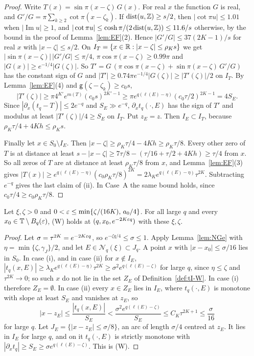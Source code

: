 \begin{proof}
Write $T(x)=\sin\pi(x-\zeta)\,G(x)$. For real $x$ the function $G$ is real, and $G'/G=\pi\sum_{k\ge2}\cot\pi(x-\zeta_k)$. If $\operatorname{dist}(u,\mathbb Z)\ge s/2$, then $|\cot\pi u|\le1.01$ when $|\operatorname{Im}u|\ge1$, and $|\cot\pi u|\le\cosh\pi/(2\operatorname{dist}(u,\mathbb Z))\le11.6/s$ otherwise, by the bound in the proof of Lemma~\ref{lem:EF}(2). Hence $|G'/G|\le37(2K-1)/s$ for real $x$ with $|x-\zeta|\le s/2$. On $I_T=\{x\in\mathbb R:|x-\zeta|\le\rho_Ks\}$ we get $|\sin\pi(x-\zeta)|\,|G'/G|\le\pi/4$, $\pi\cos\pi(x-\zeta)\ge0.99\pi$ and $|G(x)|\ge e^{-1/4}|G(\zeta)|$. So $T'=G\,(\pi\cos\pi(x-\zeta)+\sin\pi(x-\zeta)\,G'/G)$ has the constant sign of $G$ and $|T'|\ge0.74\pi e^{-1/4}|G(\zeta)|\ge|T'(\zeta)|/2$ on $I_T$. By Lemma~\ref{lem:EF}(4) and $\mathsf g(\zeta-\zeta_k)\ge c_0s$,
\[
|T'(\zeta)|\ge\pi4^{K'}e^{m(T)}(c_0s)^{2K'-1}\ge\pi e^{q(\ell(E)-\eta)}(c_0\tau/2)^{2K-1}=4S_E.
\]
Since $|\partial_x(t_q-T)|\le2e^{-q}$ and $S_E\gg e^{-q}$, $\partial_xt_q(\cdot,E)$ has the sign of $T'$ and modulus at least $|T'(\zeta)|/4\ge S_E$ on $I_T$. Put $z_E=z$. Then $I_E\subset I_T$, because $\rho_K\tau/4+4Kh\le\rho_Ks$.

Finally let $x\in S_0\setminus I_E$. Then $|x-\zeta|\ge\rho_K\tau/4-4Kh\ge\rho_K\tau/8$. Every other zero of $T$ is at distance at least $s-|x-\zeta|\ge7\tau/8-(\tau/16+\tau/2+4Kh)\ge\tau/4$ from $x$. So all zeros of $T$ are at distance at least $\rho_K\tau/8$ from $x$, and Lemma~\ref{lem:EF}(3) gives $|T(x)|\ge e^{q(\ell(E)-\eta)}(c_0\rho_K\tau/8)^{2K}=2\lambda_Ke^{q(\ell(E)-\eta)}\tau^{2K}$. Subtracting $e^{-q}$ gives the last claim of (ii). In Case~A the same bound holds, since $c_0\tau/4\ge c_0\rho_K\tau/8$.
\end{proof}

\begin{corollary}\label{cor:WXStoW}
Let $\xi,\zeta>0$ and $0<\varepsilon\le\min\{\zeta/(16K),\,a_0/4\}$. For all large $q$ and every $x_0\in\mathbb T\setminus B_q(\varepsilon)$, (W) holds at $(q,x_0,e^{-2K\varepsilon q})$ with these $\xi,\zeta$.
\end{corollary}

\begin{proof}
Let $\sigma=\tau^{2K}=e^{-2K\varepsilon q}$, so $e^{-\zeta q/4}\le\sigma\le1$. Apply Lemma~\ref{lem:NGe} with $\eta=\min\{\zeta,\gamma_J\}/2$, and let $E\in\mathcal N_q(\xi)\subset J_q$. A point $x$ with $|x-x_0|\le\sigma/16$ lies in $S_0$. In case (i), and in case (ii) for $x\notin I_E$, $|t_q(x,E)|\ge\lambda_Ke^{q(\ell(E)-\eta)}\tau^{2K}\ge\sigma^2e^{q(\ell(E)-\zeta)}$ for large $q$, since $\eta\le\zeta$ and $\tau^{2K}\to0$; so such $x$ do not lie in the set $Z_E$ of Definition~\ref{def:tI-W}. In case (i) therefore $Z_E=\emptyset$. In case (ii) every $x\in Z_E$ lies in $I_E$, where $t_q(\cdot,E)$ is monotone with slope at least $S_E$ and vanishes at $z_E$, so
\[
|x-z_E|\le\frac{|t_q(x,E)|}{S_E}<\frac{\sigma^2e^{q(\ell(E)-\zeta)}}{S_E}\le C_K\tau^{2K+1}\le\frac\sigma{16}
\]
for large $q$. Let $J_E=\{|x-z_E|\le\sigma/8\}$, an arc of length $\sigma/4$ centred at $z_E$. It lies in $I_E$ for large $q$, and on it $t_q(\cdot,E)$ is strictly monotone with $|\partial_xt_q|\ge S_E\ge\sigma e^{q(\ell(E)-\zeta)}$. This is (W).
\end{proof}

